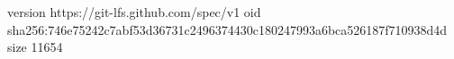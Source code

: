 version https://git-lfs.github.com/spec/v1
oid sha256:746e75242c7abf53d36731c2496374430c180247993a6bca526187f710938d4d
size 11654
